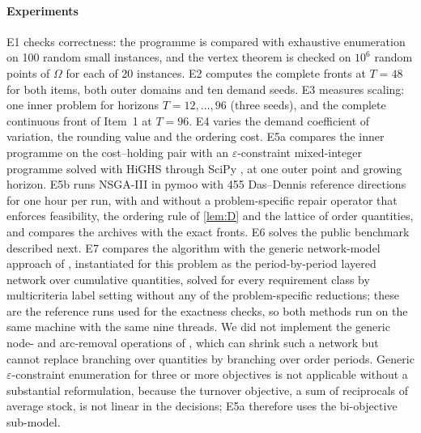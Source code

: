 \documentclass[preprint,12pt,authoryear]{elsarticle}
\begin{document}
\paragraph{Experiments}
E1 checks correctness: the programme is compared with exhaustive enumeration on 100
random small instances, and the vertex theorem is checked on $10^6$ random points of
$\Omega$ for each of 20 instances. E2 computes the complete fronts at $T=48$ for both
items, both outer domains and ten demand seeds. E3 measures scaling: one inner problem
for horizons $T=12,\dots,96$ (three seeds), and the complete continuous front of Item~1
at $T=96$. E4 varies the demand coefficient of variation, the rounding value and the
ordering cost. E5a compares the inner programme on the cost--holding pair with an
$\varepsilon$-constraint mixed-integer programme \citep{Haimes1971} solved with HiGHS
\citep{HuangfuHall2018} through SciPy \verScipy, at one outer point and growing horizon.
E5b runs NSGA-III \citep{DebJain2014} in pymoo \verPymoo{} \citep{BlankDeb2020} with 455
Das--Dennis reference directions for one hour per run, with and without a problem-specific
repair operator that enforces feasibility, the ordering rule of \cref{lem:D} and the
lattice of order quantities, and compares the archives with the exact fronts.
E6 solves the public benchmark described next. E7 compares the algorithm with the generic
network-model approach of \citet{Bergman2022}, instantiated for this problem as the
period-by-period layered network over cumulative quantities, solved for every requirement
class by multicriteria label setting without any of the problem-specific reductions; these
are the reference runs used for the exactness checks, so both methods run on the same
machine with the same nine threads. We did not implement the generic node- and
arc-removal operations of \citet{Bergman2022}, which can shrink such a network but cannot
replace branching over quantities by branching over order periods. Generic
$\varepsilon$-constraint enumeration for three or more objectives
\citep{KirlikSayin2014,TambyVanderpooten2021} is not applicable without a substantial
reformulation, because the turnover objective, a sum of reciprocals of average stock, is
not linear in the decisions; E5a therefore uses the bi-objective sub-model.
\end{document}

